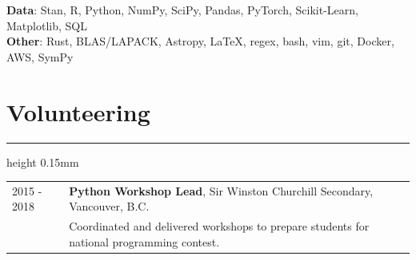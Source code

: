 \documentclass[10pt]{article}
\begin{document}
\textbf{Data}: Stan, R, Python, NumPy, SciPy, Pandas, PyTorch, Scikit-Learn, Matplotlib, SQL \\
\textbf{Other}: Rust, BLAS/LAPACK, Astropy, \LaTeX, regex, bash, vim, git, Docker, AWS, SymPy

\vspace{-2.5mm}
\section*{Volunteering}
\vspace{-1.5mm}
\hrule height 0.15mm
\vspace{2mm}

\begin{tabularx}{\textwidth}{lX}
    2015 - 2018 & \textbf{Python Workshop Lead}, Sir Winston Churchill Secondary, Vancouver, B.C. \\
                & Coordinated and delivered workshops to prepare students for national programming contest.
\end{tabularx}




\end{document}
